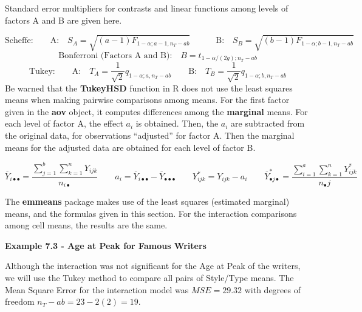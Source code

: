 \documentclass[
]{book}
\begin{document}
Standard error multipliers for contrasts and linear functions among
levels of factors A and B are given here.

\[
\mbox{Scheffe:} \qquad \mbox{A:} \quad S_A=\sqrt{(a-1)F_{1-\alpha;a-1,n_T-ab}} \qquad
\quad \mbox{B:} \quad S_B=\sqrt{(b-1)F_{1-\alpha;b-1,n_T-ab}}
\] \[
\mbox{Bonferroni (Factors A and B):} \quad B=t_{1-\alpha/(2g); n_T-ab}
\] \[
\mbox{Tukey:} \qquad \mbox{A:} \quad T_A=\frac{1}{\sqrt{2}}q_{1-\alpha;a,n_T-ab} \qquad
\mbox{B:} \quad T_B=\frac{1}{\sqrt{2}}q_{1-\alpha;b,n_T-ab}
\] Be warned that the \textbf{TukeyHSD} function in R does not use the
least squares means when making pairwise comparisons among means. For
the first factor given in the \textbf{aov} object, it computes
differences among the \textbf{marginal} means. For each level of factor
A, the effect \(a_i\) is obtained. Then, the \(a_i\) are subtracted from
the original data, for observations ``adjusted'' for factor A. Then the
marginal means for the adjusted data are obtained for each level of
factor B.

\[
\overline{Y}_{i\bullet\bullet}=\frac{\sum_{j=1}^b\sum_{k=1}^nY_{ijk}}{n_{i\bullet}}
\qquad a_i=\overline{Y}_{i\bullet\bullet}-\overline{Y}_{\bullet\bullet\bullet}
\qquad Y_{ijk}^*=Y_{ijk}-a_i  \qquad 
\overline{Y}_{\bullet j\bullet}^*=\frac{\sum_{i=1}^a\sum_{k=1}^nY_{ijk}^*}{n_{\bullet} j}
\]

The \textbf{emmeans} package makes use of the least squares (estimated
marginal) means, and the formulas given in this section. For the
interaction comparisons among cell means, the results are the same.

\textbf{Example 7.3 - Age at Peak for Famous Writers}

Although the interaction was not significant for the Age at Peak of the
writers, we will use the Tukey method to compare all pairs of Style/Type
means. The Mean Square Error for the interaction model was \(MSE=29.32\)
with degrees of freedom \(n_T-ab=23-2(2)=19\).
\end{document}

